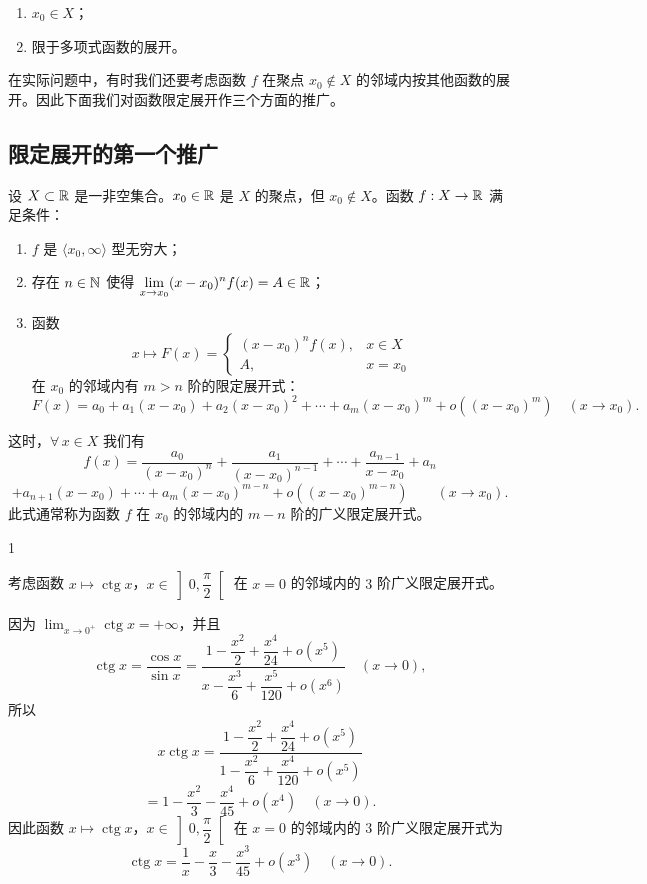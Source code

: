 \begin{enumerate}[label=\arabic{enumi})]
\item $x_0\in X$；
\item 限于多项式函数的展开。
\end{enumerate}

在实际问题中，有时我们还要考虑函数 $f$ 在聚点 $x_0\notin X$ 的邻域内按其他函数的展开。因此下面我们对函数限定展开作三个方面的推广。

\subsection{限定展开的第一个推广}

设 $X\subset\mathbb{R}$ 是一非空集合。$x_0\in\mathbb{R}$ 是 $X$ 的聚点，但 $x_0\notin X$。函数 $f:X\to\mathbb{R}$ 满足条件：

\begin{enumerate}[label=\arabic{enumi})]
\item $f$ 是 $\langle x_0,\infty\rangle$ 型无穷大；
\item 存在 $n\in\mathbb{N}$ 使得 $\displaystyle\lim_{x\to x_0}(x-x_0)^nf(x)=A\in\mathbb{R}$；
\item 函数
\[x\longmapsto F(x)=\begin{cases} (x-x_0)^nf(x), & x\in X\\ A, & x=x_0 \end{cases}\]
在 $x_0$ 的邻域内有 $m>n$ 阶的限定展开式：
\[F(x)=a_0+a_1(x-x_0)+a_2(x-x_0)^2+\cdots+a_m(x-x_0)^m+o((x-x_0)^m)\quad(x\to x_0).\]
\end{enumerate}

这时，$\forall\,x\in X$ 我们有
\[f(x)=\frac{a_0}{(x-x_0)^n}+\frac{a_1}{(x-x_0)^{n-1}}+\cdots+\frac{a_{n-1}}{x-x_0}+a_n\]
\[+a_{n+1}(x-x_0)+\cdots+a_m(x-x_0)^{m-n}+o((x-x_0)^{m-n})\qquad(x\to x_0).\]
此式通常称为函数 $f$ 在 $x_0$ 的邻域内的 $m-n$ 阶的广义限定展开式。

\begin{sourceexample}{1}

考虑函数 $x\longmapsto\operatorname{ctg}x$，$x\in\left]0,\dfrac{\pi}{2}\right[$ 在 $x=0$ 的邻域内的 $3$ 阶广义限定展开式。

因为 $\displaystyle\lim_{x\to0^+}\operatorname{ctg}x=+\infty$，并且
\[\operatorname{ctg}x=\frac{\cos x}{\sin x}=\frac{1-\dfrac{x^2}{2}+\dfrac{x^4}{24}+o(x^5)}{x-\dfrac{x^3}{6}+\dfrac{x^5}{120}+o(x^6)}\quad(x\to0),\]
所以
\[x\operatorname{ctg}x=\frac{1-\dfrac{x^2}{2}+\dfrac{x^4}{24}+o(x^5)}{1-\dfrac{x^2}{6}+\dfrac{x^4}{120}+o(x^5)}\]
\[=1-\frac{x^2}{3}-\frac{x^4}{45}+o(x^4)\quad(x\to0).\]
因此函数 $x\longmapsto\operatorname{ctg}x$，$x\in\left]0,\dfrac{\pi}{2}\right[$ 在 $x=0$ 的邻域内的 $3$ 阶广义限定展开式为
\[\operatorname{ctg}x=\frac{1}{x}-\frac{x}{3}-\frac{x^3}{45}+o(x^3)\quad(x\to0).\]

\end{sourceexample}

